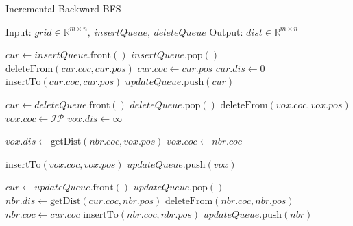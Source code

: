 \documentclass{article}
\begin{document}
\begin{algorithm}
    \caption{Incremental Backward BFS}
    \begin{algorithmic}[1]
        \STATE Input: $grid \in \mathbb{R}^{m \times n},\ insertQueue,\ deleteQueue$
        \STATE Output: $dist \in \mathbb{R}^{m \times n}$

            \STATE $cur \gets insertQueue.\mathrm{front}()$
            \STATE $insertQueue.\mathrm{pop}()$
            \STATE $\mathrm{deleteFrom}(cur.coc, cur.pos)$
            \STATE $cur.coc \gets cur.pos$
            \STATE $cur.dis \gets 0$
            \STATE $\mathrm{insertTo}(cur.coc, cur.pos)$
            \STATE $updateQueue.\mathrm{push}(cur)$
        \ENDWHILE

            \STATE $cur \gets deleteQueue.\mathrm{front}()$
            \STATE $deleteQueue.\mathrm{pop}()$
                \STATE $\mathrm{deleteFrom}(vox.coc, vox.pos)$
                \STATE $vox.coc \gets \mathcal{IP}$
                \STATE $vox.dis \gets \infty$

                        \STATE $vox.dis \gets \mathrm{getDist}(nbr.coc, vox.pos)$
                        \STATE $vox.coc \gets nbr.coc$
                    \ENDIF
                \ENDFOR

                \STATE $\mathrm{insertTo}(vox.coc, vox.pos)$
                    \STATE $updateQueue.\mathrm{push}(vox)$
                \ENDIF
            \ENDFOR
        \ENDWHILE

            \STATE $cur \gets updateQueue.\mathrm{front}()$
            \STATE $updateQueue.\mathrm{pop}()$
                    \STATE $nbr.dis \gets \mathrm{getDist}(cur.coc, nbr.pos)$
                    \STATE $\mathrm{deleteFrom}(nbr.coc, nbr.pos)$
                    \STATE $nbr.coc \gets cur.coc$
                    \STATE $\mathrm{insertTo}(nbr.coc, nbr.pos)$
                    \STATE $updateQueue.\mathrm{push}(nbr)$
                \ENDIF
            \ENDFOR
        \ENDWHILE
    \end{algorithmic}
\end{algorithm}
\end{document}
